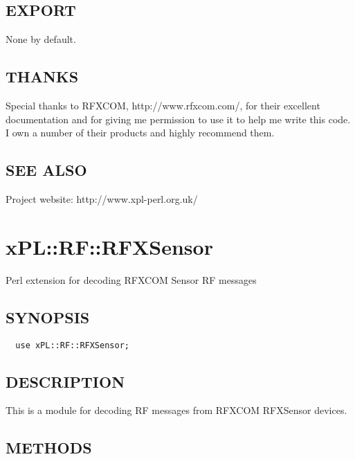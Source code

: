 \documentclass[12pt,a4paper]{article}
\begin{document}
\subsection*{EXPORT\label{xPL::RF::RFXMeter_EXPORT}}


None by default.

\subsection*{THANKS\label{xPL::RF::RFXMeter_THANKS}}


Special thanks to RFXCOM, \textsf{http://www.rfxcom.com/}, for their
excellent documentation and for giving me permission to use it to help
me write this code.  I own a number of their products and highly
recommend them.

\subsection*{SEE ALSO\label{xPL::RF::RFXMeter_SEE_ALSO}}


Project website: http://www.xpl-perl.org.uk/

\newpage
\section{xPL::RF::RFXSensor\label{xPL::RF::RFXSensor}}


Perl extension for decoding RFXCOM Sensor RF messages

\subsection*{SYNOPSIS\label{xPL::RF::RFXSensor_SYNOPSIS}}
\begin{verbatim}
  use xPL::RF::RFXSensor;
\end{verbatim}
\subsection*{DESCRIPTION\label{xPL::RF::RFXSensor_DESCRIPTION}}


This is a module for decoding RF messages from RFXCOM RFXSensor devices.

\subsection*{METHODS\label{xPL::RF::RFXSensor_METHODS}}
\end{document}

